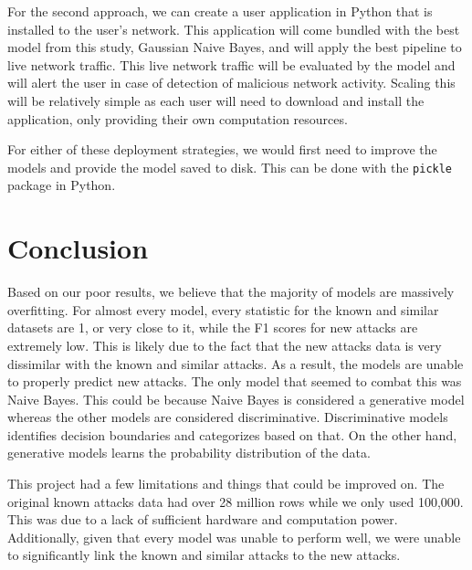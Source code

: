 \documentclass[journal]{IEEEtran}
\begin{document}
For the second approach, we can create a user application in Python that is installed to the user's network. This application will come bundled with the best model from this study, Gaussian Naive Bayes, and will apply the best pipeline to live network traffic. This live network traffic will be evaluated by the model and will alert the user in case of detection of malicious network activity. Scaling this will be relatively simple as each user will need to download and install the application, only providing their own computation resources.

For either of these deployment strategies, we would first need to improve the models and provide the model saved to disk. This can be done with the \lstinline{pickle} package in Python.

\section{Conclusion}

Based on our poor results, we believe that the majority of models are massively overfitting. For almost every model, every statistic for the known and similar datasets are 1, or very close to it, while the F1 scores for new attacks are extremely low. This is likely due to the fact that the new attacks data is very dissimilar with the known and similar attacks. As a result, the models are unable to properly predict new attacks. The only model that seemed to combat this was Naive Bayes. This could be because Naive Bayes is considered a generative model whereas the other models are considered discriminative. Discriminative models identifies decision boundaries and categorizes based on that. On the other hand, generative models learns the probability distribution of the data.

This project had a few limitations and things that could be improved on. The original known attacks data had over 28 million rows while we only used 100,000. This was due to a lack of sufficient hardware and computation power. Additionally, given that every model was unable to perform well, we were unable to significantly link the known and similar attacks to the new attacks.

\ifCLASSOPTIONcaptionsoff
  \newpage
\fi




\vfill
\end{document}
